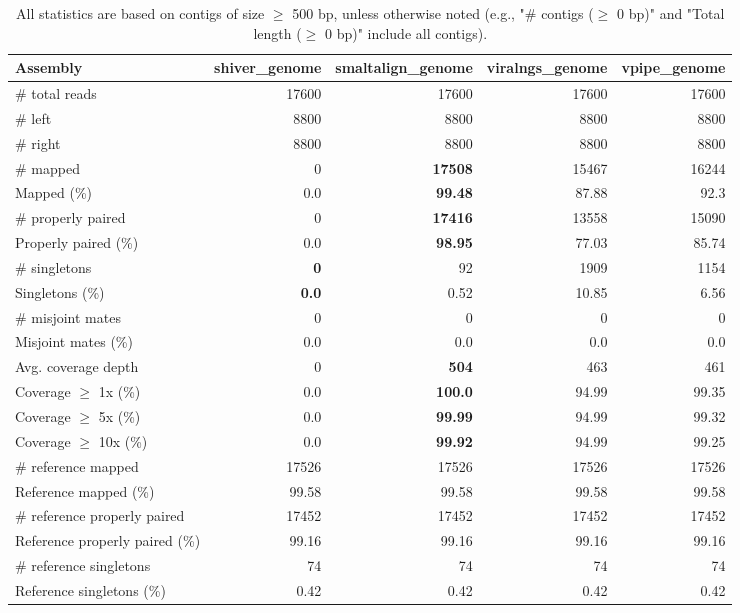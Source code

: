 \documentclass[12pt,a4paper]{article}
\begin{document}
\begin{table}[ht]
\begin{center}
\caption{All statistics are based on contigs of size $\geq$ 500 bp, unless otherwise noted (e.g., "\# contigs ($\geq$ 0 bp)" and "Total length ($\geq$ 0 bp)" include all contigs).}
\begin{tabular}{|l*{4}{|r}|}
\hline
Assembly & shiver\_genome & smaltalign\_genome & viralngs\_genome & vpipe\_genome \\ \hline
\# total reads & 17600 & 17600 & 17600 & 17600 \\ \hline
\# left & 8800 & 8800 & 8800 & 8800 \\ \hline
\# right & 8800 & 8800 & 8800 & 8800 \\ \hline
\# mapped & 0 & {\bf 17508} & 15467 & 16244 \\ \hline
Mapped (\%) & 0.0 & {\bf 99.48} & 87.88 & 92.3 \\ \hline
\# properly paired & 0 & {\bf 17416} & 13558 & 15090 \\ \hline
Properly paired (\%) & 0.0 & {\bf 98.95} & 77.03 & 85.74 \\ \hline
\# singletons & {\bf 0} & 92 & 1909 & 1154 \\ \hline
Singletons (\%) & {\bf 0.0} & 0.52 & 10.85 & 6.56 \\ \hline
\# misjoint mates & 0 & 0 & 0 & 0 \\ \hline
Misjoint mates (\%) & 0.0 & 0.0 & 0.0 & 0.0 \\ \hline
Avg. coverage depth & 0 & {\bf 504} & 463 & 461 \\ \hline
Coverage $\geq$ 1x (\%) & 0.0 & {\bf 100.0} & 94.99 & 99.35 \\ \hline
Coverage $\geq$ 5x (\%) & 0.0 & {\bf 99.99} & 94.99 & 99.32 \\ \hline
Coverage $\geq$ 10x (\%) & 0.0 & {\bf 99.92} & 94.99 & 99.25 \\ \hline
\# reference mapped & 17526 & 17526 & 17526 & 17526 \\ \hline
Reference mapped (\%) & 99.58 & 99.58 & 99.58 & 99.58 \\ \hline
\# reference properly paired & 17452 & 17452 & 17452 & 17452 \\ \hline
Reference properly paired (\%) & 99.16 & 99.16 & 99.16 & 99.16 \\ \hline
\# reference singletons & 74 & 74 & 74 & 74 \\ \hline
Reference singletons (\%) & 0.42 & 0.42 & 0.42 & 0.42 \\ \hline

\end{tabular}
\end{center}
\end{table}
\end{document}
